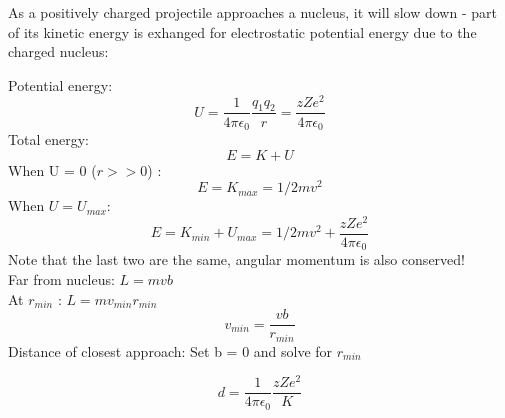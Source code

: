 \documentclass[class=article,crop=false]{standalone}
\begin{document}
\newpage
\begin{question}
	As a positively charged projectile approaches a nucleus, it will slow down - part of its kinetic energy is exhanged for electrostatic potential energy due to the charged nucleus:
	\begin{answer}[Answer]
		Potential energy:
		$$ U = \frac{1}{4 \pi \epsilon_0} \frac{q_1 q_2}{r} = \frac{zZe^2}{4 \pi \epsilon_0} $$
		Total energy:
		$$ E = K + U $$
		When U = 0 ($r >> 0$) : 
		$$ E = K_{max} = 1/2 mv^2 $$
		When $ U = U_{max}$:
		$$ E = K_{min} + U_{max} = 1/2 mv^2 + \frac{zZe^2}{4 \pi \epsilon_0} $$
		Note that the last two are the same, angular momentum is also conserved!\\
		Far from nucleus: $ L = mvb$ \\
		At $r_{min}$ : $ L = mv_{min} r_{min} $\\
		$$ v_{min} = \frac{vb}{r_{min}} $$
		Distance of closest approach:
		Set b = 0 and solve for $r_{min}$
		\begin{result}
			$$ d = \frac{1}{4\pi\epsilon_0} \frac{zZe^2}{K} $$
		\end{result}
	\end{answer}
\end{question}
\end{document}
